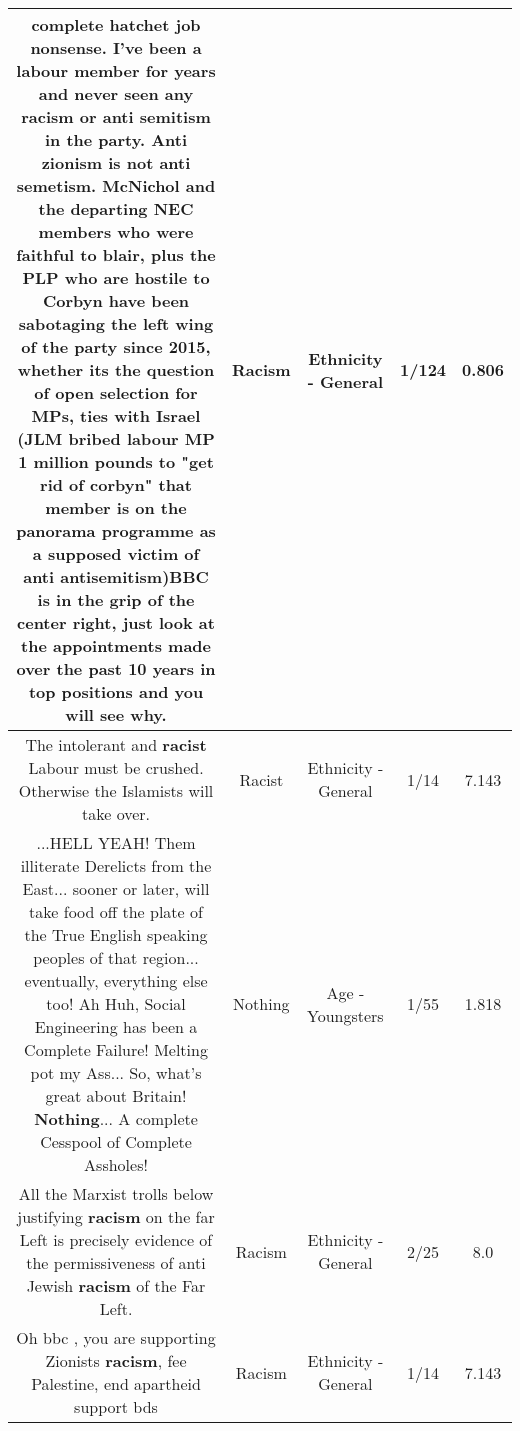 \documentclass[11pt]{article}
\newlength\mylength
\begin{document}
\begin{center}
\begin{longtable}{|C{.65\mylength}|C{.30\mylength}|C{.12\mylength}|C{.12\mylength}|C{.12\mylength}|}
  \small complete hatchet job nonsense. I've been a labour member for years and never seen any \textbf{racism} or anti semitism in the party. Anti zionism is not anti semetism. McNichol and the departing NEC members who were faithful to blair, plus the PLP who are hostile to Corbyn have been sabotaging the left wing of the party since 2015, whether its the question of open selection for MPs, ties with Israel (JLM bribed labour MP 1 million pounds to "get rid of corbyn" that member is on the panorama programme as a supposed victim of anti antisemitism)BBC is in the grip of the center right, just look at the appointments made over the past 10 years in top positions and you will see why.\normalsize   & Racism & Ethnicity - General & 1/124 & 0.806 \\  \hline
  \small The intolerant and \textbf{racist} Labour must be crushed. Otherwise the Islamists will take over.\normalsize   & Racist & Ethnicity - General & 1/14 & 7.143 \\  \hline
  \small ...HELL YEAH!  Them illiterate Derelicts from the East... sooner or later, will take food off the plate of the True English speaking peoples of that region... eventually, everything else too!  Ah Huh, Social Engineering has been a Complete Failure!   Melting pot my Ass...  So, what's great about Britain!   \textbf{Nothing}... A complete Cesspool of Complete Assholes!\normalsize   & Nothing & Age - Youngsters & 1/55 & 1.818 \\  \hline
  \small All the Marxist trolls below justifying \textbf{racism} on the far Left is precisely evidence of the permissiveness of anti Jewish \textbf{racism} of the Far Left.\normalsize   & Racism & Ethnicity - General & 2/25 & 8.0 \\  \hline
  \small Oh bbc , you are supporting Zionists \textbf{racism}, fee Palestine,  end apartheid support bds\normalsize   & Racism & Ethnicity - General & 1/14 & 7.143 \\  \hline

\end{longtable}
\end{center}
\end{document}
